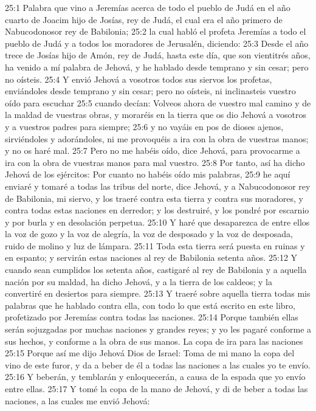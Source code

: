 25:1 Palabra que vino a Jeremías acerca de todo el pueblo de Judá en el año cuarto de Joacim hijo de Josías, rey de Judá, el cual era el año primero de Nabucodonosor rey de Babilonia; 
25:2 la cual habló el profeta Jeremías a todo el pueblo de Judá y a todos los moradores de Jerusalén, diciendo: 
25:3 Desde el año trece de Josías hijo de Amón, rey de Judá, hasta este día, que son vientitrés años, ha venido a mí palabra de Jehová, y he hablado desde temprano y sin cesar; pero no oísteis. 
25:4 Y envió Jehová a vosotros todos sus siervos los profetas, enviándoles desde temprano y sin cesar; pero no oísteis, ni inclinasteis vuestro oído para escuchar 
25:5 cuando decían: Volveos ahora de vuestro mal camino y de la maldad de vuestras obras, y moraréis en la tierra que os dio Jehová a vosotros y a vuestros padres para siempre; 
25:6 y no vayáis en pos de dioses ajenos, sirviéndoles y adorándoles, ni me provoquéis a ira con la obra de vuestras manos; y no os haré mal. 
25:7 Pero no me habéis oído, dice Jehová, para provocarme a ira con la obra de vuestras manos para mal vuestro. 
25:8 Por tanto, así ha dicho Jehová de los ejércitos: Por cuanto no habéis oído mis palabras, 
25:9 he aquí enviaré y tomaré a todas las tribus del norte, dice Jehová, y a Nabucodonosor rey de Babilonia, mi siervo, y los traeré contra esta tierra y contra sus moradores, y contra todas estas naciones en derredor; y los destruiré, y los pondré por escarnio y por burla y en desolación perpetua. 
25:10 Y haré que desaparezca de entre ellos la voz de gozo y la voz de alegría, la voz de desposado y la voz de desposada, ruido de molino y luz de lámpara. 
25:11 Toda esta tierra será puesta en ruinas y en espanto; y servirán estas naciones al rey de Babilonia setenta años. 
25:12 Y cuando sean cumplidos los setenta años, castigaré al rey de Babilonia y a aquella nación por su maldad, ha dicho Jehová, y a la tierra de los caldeos; y la convertiré en desiertos para siempre. 
25:13 Y traeré sobre aquella tierra todas mis palabras que he hablado contra ella, con todo lo que está escrito en este libro, profetizado por Jeremías contra todas las naciones. 
25:14 Porque también ellas serán sojuzgadas por muchas naciones y grandes reyes; y yo les pagaré conforme a sus hechos, y conforme a la obra de sus manos. 
La copa de ira para las naciones 
25:15 Porque así me dijo Jehová Dios de Israel: Toma de mi mano la copa del vino de este furor, y da a beber de él a todas las naciones a las cuales yo te envío. 
25:16 Y beberán, y temblarán y enloquecerán, a causa de la espada que yo envío entre ellas. 
25:17 Y tomé la copa de la mano de Jehová, y di de beber a todas las naciones, a las cuales me envió Jehová: 
